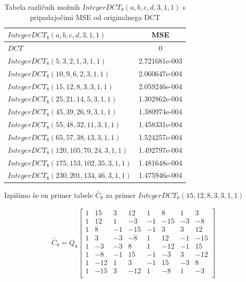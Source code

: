 \documentclass[a4paper,12pt,openright]{book}
\begin{document}
\begin{table}[ht]
\centering
\begin{tabular}{|l|c|}
\hline
$IntegerDCT_8(a,b,c,d,3,1,1)$              &MSE          \\
\hline
$DCT                                     $ &0             \\
$IntegerDCT_8(5, 3, 2, 1, 3, 1, 1)       $ &2.721681e-003\\ 
$IntegerDCT_8(10, 9, 6, 2, 3, 1, 1)      $ &2.060647e-004\\ 
$IntegerDCT_8(15, 12, 8, 3, 3, 1, 1)     $ &2.059246e-004\\ 
$IntegerDCT_8(25, 21, 14, 5, 3, 1, 1)    $ &1.302862e-004\\ 
$IntegerDCT_8(45, 39, 26, 9, 3, 1, 1)    $ &1.380974e-004\\ 
$IntegerDCT_8(55, 48, 32, 11, 3, 1, 1)   $ &1.458331e-004\\ 
$IntegerDCT_8(65, 57, 38, 13, 3, 1, 1)   $ &1.524257e-004\\ 
$IntegerDCT_8(120, 105, 70, 24, 3, 1, 1) $ &1.492797e-004\\ 
$IntegerDCT_8(175, 153, 102, 35, 3, 1, 1)$ &1.481648e-004\\ 
$IntegerDCT_8(230, 201, 134, 46, 3, 1, 1)$ &1.475946e-004\\ 
\hline
\end{tabular}
\caption{Tabela različnih možnih $IntegerDCT_8(a,b,c,d,3,1,1)$ s pripadajočimi MSE od originalnega DCT}
\label{tab:IntegerDCT_8}
\end{table}
Izpišimo še en primer tabele $\widetilde{C_8}$ za primer $IntegerDCT_8(15, 12, 8, 3, 3, 1, 1)$

\begin{gather}
   \widetilde{C_8} = Q_8
 \begin{bmatrix} 
    1& 15&  3& 12&  1&  8&  1&  3\\ 
    1& 12&  1& -3& -1&-15& -3& -8\\
    1&  8& -1&-15& -1&  3&  3& 12\\
    1&  3& -3& -8&  1& 12& -1&-15\\
    1& -3& -3&  8&  1&-12& -1& 15\\
    1& -8& -1& 15& -1& -3&  3&-12\\
    1&-12&  1&  3& -1& 15& -3&  8\\ 
    1&-15&  3&-12&  1& -8&  1& -3\\
 \end{bmatrix}
\label{eq:IntegerDCT_8(15, 12, 8, 3, 3, 1, 1)}
\end{gather}
\end{document}
